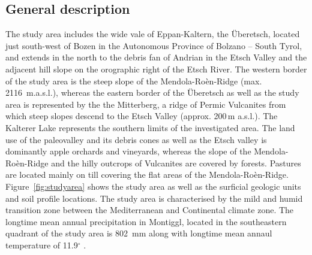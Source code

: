 \documentclass[preprint,12pt,authoryear]{elsarticle}
\begin{document}
\subsection{General description}
The study area includes the wide vale of Eppan-Kaltern, the {\"U}beretsch, located just south-west of Bozen in the Autonomous Province of Bolzano -- South Tyrol, and extends in the north to the debris fan of Andrian in the Etsch Valley and the adjacent hill slope on the orographic right of the Etsch River. The western border of the study area is the steep slope of the Mendola-Ro\`en-Ridge (max. 2116~m.a.s.l.), whereas the eastern border of the {\"U}beretsch as well as the study area is represented by the the Mitterberg, a ridge of Permic Vulcanites from which steep slopes descend to the Etsch Valley (approx. 200\,m a.s.l.). The Kalterer Lake represents the southern limits of the investigated area. The land use of the paleovalley and its debris cones as well as the Etsch valley is dominantly apple orchards and vineyards, whereas the slope of the  Mendola-Ro\`en-Ridge and the hilly outcrops of Vulcanites are covered by forests. Pastures are located mainly on till covering the flat areas of the  Mendola-Ro\`en-Ridge. Figure~\ref{fig:studyarea} shows the study area as well as the surficial geologic units and soil profile locations. The study area is characterised by the mild and humid transition zone between the Mediterranean and Continental climate zone. The longtime mean annual precipitation in Montiggl, located in the southeastern quadrant of the study area is 802~mm along with longtime mean annaul temperature of 11.9$^{\circ}$ \citep{Thalheimer2006}.
\end{document}
